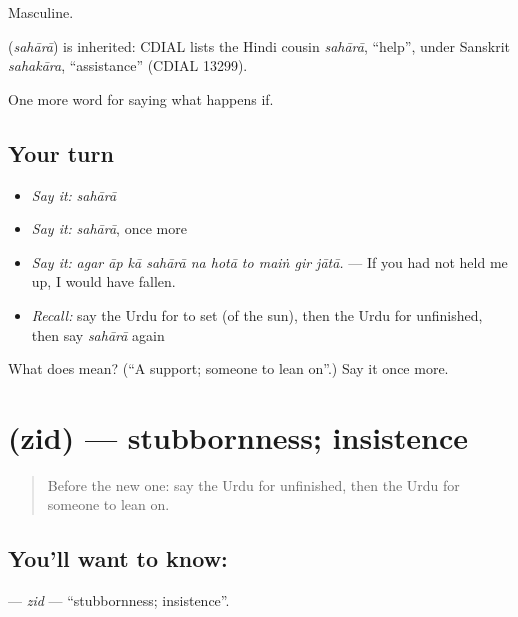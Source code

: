 Masculine.

\begin{cousinweb}
\textbf{} (\emph{sahārā}) is inherited: CDIAL lists the Hindi cousin \emph{sahārā}, \textquotedblleft{}help\textquotedblright{}, under Sanskrit \emph{sahakāra}, \textquotedblleft{}assistance\textquotedblright{} (CDIAL 13299).
\end{cousinweb}

\begin{grammarlens}[title={What you've built}]
One more word for saying what happens if.
\end{grammarlens}

\subsection*{Your turn}
\begin{itemize}
\raggedright
  \item \emph{Say it:} \emph{sahārā}
  \item \emph{Say it:} \emph{sahārā}, once more
  \item \emph{Say it:} \emph{agar āp kā sahārā na hotā to maiṅ gir jātā.} — If you had not held me up, I would have fallen.
  \item \emph{Recall:} say the Urdu for to set (of the sun), then the Urdu for unfinished, then say \emph{sahārā} again
\end{itemize}

\begin{tcolorbox}[breakable,colback=teal!4,colframe=teal!35!black,title={Before you move on}]
What does  mean? (\textquotedblleft{}A support; someone to lean on\textquotedblright{}.) Say it once more.
\end{tcolorbox}
\section[\texorpdfstring{\ur{ضد} (zid)}{ضد (zid)}]{ (zid) — stubbornness; insistence}

\label{lesson:UR-C374-zid}



\begin{quote}
Before the new one: say the Urdu for unfinished, then the Urdu for someone to lean on.
\end{quote}

\subsection*{You'll want to know: }
\textbf{} — \emph{zid} — \textquotedblleft{}stubbornness; insistence\textquotedblright{}.

